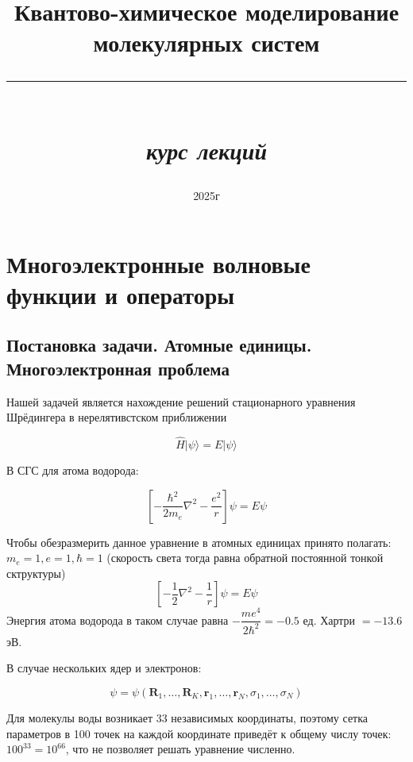 \documentclass[12pt, oneside]{article}
\title{\huge Квантово-химическое моделирование молекулярных систем\\ \rule{0.8\textwidth}{0.4pt} \\ \large \textit{курс лекций}}
\date{2025г}
\numberwithin{equation}{section}  %
\begin{document}
\maketitle
\tableofcontents

\vspace{.25in}

\section{Многоэлектронные волновые функции и операторы}

\subsection{Постановка задачи. Атомные единицы. Многоэлектронная проблема}


\hspace{0.4cm} Нашей задачей является нахождение решений стационарного уравнения Шрёдингера в нерелятивстском приближении

\begin{equation}
    \hat{H} |\psi \rangle = E | \psi \rangle
    \label{eq:Shr}
\end{equation}

В СГС для атома водорода:

\begin{equation}
    \left[ - \dfrac{\hbar^2}{2 m_e} \nabla^2 - \dfrac{e^2}{r}\right] \psi = E \psi
\end{equation}


Чтобы обезразмерить данное уравнение в атомных единицах принято полагать: \(m_e = 1, e = 1, \hbar = 1\) (скорость света тогда равна обратной постоянной тонкой сктруктуры)
\begin{equation}
    \left[- \dfrac{1}{2} \nabla^2 - \dfrac{1}{r} \right] \psi = E \psi
\end{equation}
Энергия атома водорода в таком случае равна \(- \dfrac{m e^4}{2 \hbar^2} = - 0.5\) ед. Хартри \( = -13.6\) эВ.

В случае нескольких ядер и электронов:

\begin{equation}
    \psi = \psi(\bm{R}_1, \dots, \bm{R}_K, \bm{r}_1, \dots, \bm{r}_N, \sigma_1, \dots, \sigma_N)
\end{equation}


Для молекулы воды возникает 33 независимых координаты, поэтому сетка параметров в 100 точек на каждой координате приведёт к общему числу точек: \(100^{33} = 10^{66}\), что не позволяет решать уравнение численно.
\end{document}
